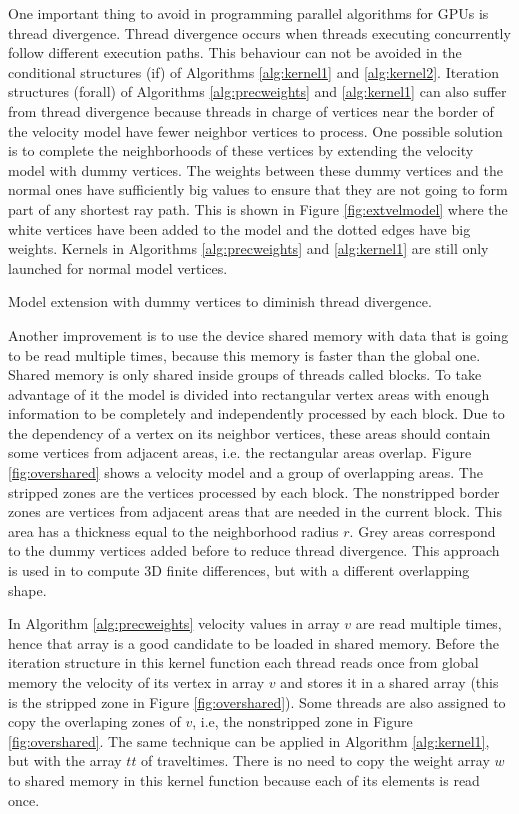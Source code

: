 One important thing to avoid in programming parallel
algorithms for GPUs is thread divergence. Thread 
divergence occurs when threads executing concurrently follow
different execution paths. This behaviour can not be avoided
in the conditional structures (if) of Algorithms \ref{alg:kernel1}
and \ref{alg:kernel2}. Iteration structures (forall) of Algorithms
\ref{alg:precweights} and \ref{alg:kernel1} can also suffer
from thread divergence because threads in charge of vertices
near the border of the velocity model have fewer neighbor
vertices to process. One possible solution is to complete the 
neighborhoods of these vertices by extending the velocity model 
with dummy vertices. The weights between these dummy vertices and 
the normal ones have sufficiently big values to ensure that they 
are not going to form part of any shortest ray path. This is shown 
in Figure  \ref{fig:extvelmodel} where the white vertices have been 
added to the model and the dotted edges have big weights. Kernels
in Algorithms \ref{alg:precweights} and \ref{alg:kernel1} are
still only launched for normal model vertices.

{Model extension with dummy vertices to diminish thread divergence.}

Another improvement is to use the device shared memory with
data that is going to be read multiple times, because this
memory is faster than the global one. Shared
memory is only shared inside groups of threads called blocks.
To take advantage of it the model is divided into rectangular
vertex areas with enough information to be completely and 
independently processed by each block. Due to the dependency 
of a vertex on its neighbor vertices, these areas should 
contain some vertices from adjacent areas, i.e. the rectangular 
areas overlap. Figure \ref{fig:overshared} shows a velocity 
model and a group of overlapping areas. The stripped zones 
are the vertices processed by each block. The nonstripped 
border zones are vertices from adjacent areas that are needed 
in the current block. This area has a thickness equal to the 
neighborhood radius $r$. Grey areas correspond to the dummy 
vertices added before to reduce thread divergence. This approach 
is used in \cite{Micikevicius:2009:FDC:1513895.1513905} to compute
3D finite differences, but with a different overlapping shape.

In Algorithm 
\ref{alg:precweights} velocity values in array $v$ are read 
multiple times, hence that array is a good candidate to be 
loaded in shared memory. Before the iteration structure in this
kernel function each 
thread reads once from global memory the velocity of its vertex 
in array $v$ and stores it in a shared array (this is the
stripped zone in Figure \ref{fig:overshared}). Some threads are 
also assigned to copy the overlaping zones of $v$, i.e, the
nonstripped zone in Figure \ref{fig:overshared}. The same
technique can be applied in Algorithm \ref{alg:kernel1}, but with 
the array $tt$ of traveltimes. There is no need to copy the
weight array $w$ to shared memory in this kernel function because 
each of its elements is read once.

